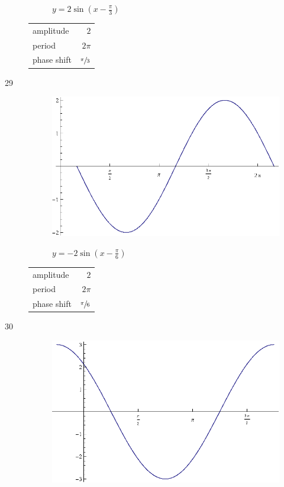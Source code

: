 \documentclass{exam}
\begin{document}
\begin{description}
\begin{figure}[H]
          $y = 2 \sin \left( x - \frac{\pi}{3} \right)$
        \end{figure}

        \begin{tabular}[H]{lr}
          \toprule
          amplitude   & $2$ \\
          period      & $2 \pi$ \\
          phase shift & $\sfrac{\pi}{3}$ \\
          \bottomrule
        \end{tabular}

      \item[29]
        \begin{figure}[H]
          \centering
          \includegraphics[scale=0.8]{exercise29.eps}

          $y = - 2 \sin \left( x - \frac{\pi}{6} \right)$
        \end{figure}

        \begin{tabular}[H]{lr}
          \toprule
          amplitude   & $2$ \\
          period      & $2 \pi$ \\
          phase shift & $\sfrac{\pi}{6}$ \\
          \bottomrule
        \end{tabular}

      \item[30]
        \begin{figure}[H]
          \centering
          \includegraphics[scale=0.8]{exercise30.eps}


\end{figure}
\end{description}
\end{document}
